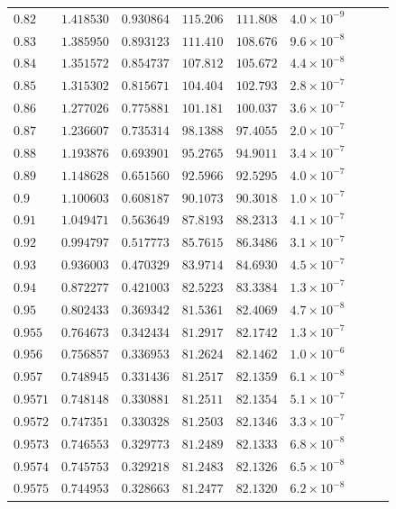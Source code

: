 \documentclass[12pt]{extarticle}
\theoremstyle{plain}
\theoremstyle{remark}
\begin{document}
\begin{longtable}{lcccccccc}
$0.82$ & $1.418530$ & $0.930864$ & $115.206$ & $111.808$ & $4.0\times10^{-9}$ \\
$0.83$ & $1.385950$ & $0.893123$ & $111.410$ & $108.676$ & $9.6\times10^{-8}$ \\
$0.84$ & $1.351572$ & $0.854737$ & $107.812$ & $105.672$ & $4.4\times10^{-8}$ \\
$0.85$ & $1.315302$ & $0.815671$ & $104.404$ & $102.793$ & $2.8\times10^{-7}$ \\
$0.86$ & $1.277026$ & $0.775881$ & $101.181$ & $100.037$ & $3.6\times10^{-7}$ \\
$0.87$ & $1.236607$ & $0.735314$ & $98.1388$ & $97.4055$ & $2.0\times10^{-7}$ \\
$0.88$ & $1.193876$ & $0.693901$ & $95.2765$ & $94.9011$ & $3.4\times10^{-7}$ \\
$0.89$ & $1.148628$ & $0.651560$ & $92.5966$ & $92.5295$ & $4.0\times10^{-7}$ \\
$0.9$ & $1.100603$ & $0.608187$ & $90.1073$ & $90.3018$ & $1.0\times10^{-7}$ \\
$0.91$ & $1.049471$ & $0.563649$ & $87.8193$ & $88.2313$ & $4.1\times10^{-7}$ \\
$0.92$ & $0.994797$ & $0.517773$ & $85.7615$ & $86.3486$ & $3.1\times10^{-7}$ \\
$0.93$ & $0.936003$ & $0.470329$ & $83.9714$ & $84.6930$ & $4.5\times10^{-7}$ \\
$0.94$ & $0.872277$ & $0.421003$ & $82.5223$ & $83.3384$ & $1.3\times10^{-7}$ \\
$0.95$ & $0.802433$ & $0.369342$ & $81.5361$ & $82.4069$ & $4.7\times10^{-8}$ \\
$0.955$ & $0.764673$ & $0.342434$ & $81.2917$ & $82.1742$ & $1.3\times10^{-7}$ \\
$0.956$ & $0.756857$ & $0.336953$ & $81.2624$ & $82.1462$ & $1.0\times10^{-6}$ \\
$0.957$ & $0.748945$ & $0.331436$ & $81.2517$ & $82.1359$ & $6.1\times10^{-8}$ \\
$0.9571$ & $0.748148$ & $0.330881$ & $81.2511$ & $82.1354$ & $5.1\times10^{-7}$ \\
$0.9572$ & $0.747351$ & $0.330328$ & $81.2503$ & $82.1346$ & $3.3\times10^{-7}$ \\
$0.9573$ & $0.746553$ & $0.329773$ & $81.2489$ & $82.1333$ & $6.8\times10^{-8}$ \\
$0.9574$ & $0.745753$ & $0.329218$ & $81.2483$ & $82.1326$ & $6.5\times10^{-8}$ \\
$0.9575$ & $0.744953$ & $0.328663$ & $81.2477$ & $82.1320$ & $6.2\times10^{-8}$ \\

\end{longtable}
\end{document}
